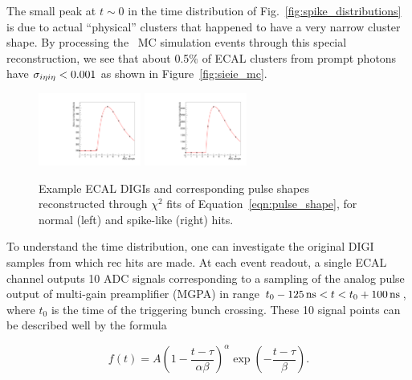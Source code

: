 The small peak at $t\sim 0$ in the time distribution of Fig.~\ref{fig:spike_distributions} is due to actual ``physical'' clusters that happened to have a very narrow cluster shape. 
By processing the \gj\ MC simulation events through this special reconstruction, we see that about 0.5\% of ECAL clusters from prompt photons have $\sigma_{i\eta i\eta} < 0.001$ as shown in Figure~\ref{fig:sieie_mc}.

\begin{figure}[tbp]
  \begin{center}
    \includegraphics[width=0.3\textwidth]{Reconstruction/Figures/spikes/pulse_example_normal.pdf}
    \includegraphics[width=0.3\textwidth]{Reconstruction/Figures/spikes/pulse_example_spike.pdf}
    \caption{
      Example ECAL DIGIs and corresponding pulse shapes reconstructed through $\chi^{2}$ fits of Equation~\ref{eqn:pulse_shape}, for normal (left) and spike-like (right) hits.
    }
    \label{fig:pulse_examples}
  \end{center}
\end{figure}

To understand the time distribution, one can investigate the original DIGI samples from which rec hits are made. 
At each event readout, a single ECAL channel outputs 10 ADC signals corresponding to a sampling of the analog pulse output of multi-gain preamplifier (MGPA) in range $t_{0} - 125\, \text{ns} < t < t_{0} + 100\, \text{ns}$, where $t_{0}$ is the time of the triggering bunch crossing. 
These 10 signal points can be described well by the formula

\begin{equation} \label{eqn:pulse_shape}
  f(t) = A \left(1 - \frac{t - \tau}{\alpha\beta}\right)^{\alpha} \exp \left(-\frac{t-\tau}{\beta}\right).
\end{equation}

